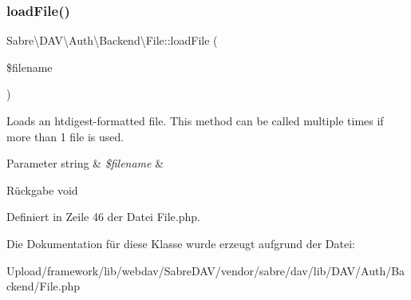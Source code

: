 \subsubsection{\texorpdfstring{load\+File()}{loadFile()}}
{\footnotesize\ttfamily Sabre\textbackslash{}\+D\+A\+V\textbackslash{}\+Auth\textbackslash{}\+Backend\textbackslash{}\+File\+::load\+File (\begin{DoxyParamCaption}\item[{}]{\$filename }\end{DoxyParamCaption})}

Loads an htdigest-\/formatted file. This method can be called multiple times if more than 1 file is used.


\begin{DoxyParams}[1]{Parameter}
string & {\em \$filename} & \\
\hline
\end{DoxyParams}
\begin{DoxyReturn}{Rückgabe}
void 
\end{DoxyReturn}


Definiert in Zeile 46 der Datei File.\+php.



Die Dokumentation für diese Klasse wurde erzeugt aufgrund der Datei\+:\begin{DoxyCompactItemize}
\item 
Upload/framework/lib/webdav/\+Sabre\+D\+A\+V/vendor/sabre/dav/lib/\+D\+A\+V/\+Auth/\+Backend/File.\+php\end{DoxyCompactItemize}
